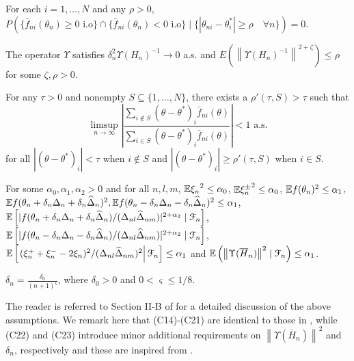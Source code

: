 \begin{pvn}
\item For each $i=1,\ldots,N$ and any $\rho>0$, 
$P(\{ \bar f_{ni} (\theta_n) \ge 0 \text{ i.o}\} \cap \{ \bar f_{ni} (\theta_n) < 0 \text{ i.o}\} \mid \{ |\theta_{ni} - \theta^*_i| \ge \rho\quad \forall n\}) =0.$

\item The operator $\Upsilon$ satisfies $\delta_n^2 \Upsilon(H_n)^{-1} \rightarrow 0$ a.s. and  $E(\left\| \Upsilon(H_n)^{-1}\right\|^{2+\zeta}) \le \rho$ for some $\zeta, \rho>0$.

\item For any $\tau >0$ and nonempty $S \subseteq \{1,\ldots,N\}$, there exists a $\rho'(\tau,S)>\tau$ such that 
$$ \limsup_{n\rightarrow \infty} \left| \dfrac{\sum_{i \notin S} (\theta-\theta^*)_i \bar f_{ni}(\theta)}{\sum_{i \in S} (\theta-\theta^*)_i \bar f_{ni}(\theta)}               \right| < 1 \text{ a.s.}$$
for all $|(\theta-\theta^*)_i| < \tau$ when $i \notin S$ and $|(\theta-\theta^*)_i| \ge \rho'(\tau,S)$ when $i\in S$.
\item For some $\alpha_0, \alpha_1, \alpha_2 >0$ and for all $n,l,m$, $\mathbb{E} {\xi_n}^{2} \le \alpha_0$, $\mathbb{E} {\xi_n^{\pm}}^{2} \le \alpha_0$, $\mathbb{E} f(\theta_n)^{2} \le \alpha_1$,  $\mathbb{E} f(\theta_n + \delta_n \Delta_n + \delta_n \widehat \Delta_n)^{2},\mathbb{E} f(\theta_n - \delta_n \Delta_n - \delta_n \widehat \Delta_n)^{2} \le \alpha_1$, 
$\mathbb{E} \left[| f(\theta_n + \delta_n \Delta_n + \delta_n \widehat \Delta_n)/ (\Delta_{nl}\widehat\Delta_{nm})|^{2+\alpha_2} \mid \mathcal{F}_n\right]$,
$\mathbb{E} \left[ |f(\theta_n - \delta_n \Delta_n - \delta_n \widehat \Delta_n)/ (\Delta_{nl}\widehat\Delta_{nm})|^{2+\alpha_2} \mid \mathcal{F}_n\right]$,
 $\mathbb{E}\left[\left. (\xi_n^+ + \xi_n^- - 2 \xi_n)^2/(\Delta_{nl}\widehat\Delta_{nm})^2 \right| \mathcal{F}_n \right] \le \alpha_1$ 
and $\mathbb{E} \left(\left\| \Upsilon(\overline H_n) \right\|^2 \mid \mathcal{F}_n\right) \le \alpha_1$. 
\item  $\delta_n = \frac{\delta_0}{(n+1)^{\varsigma}}$, where $\delta_0 > 0$ and $0 < \varsigma \le 1/8$.
\end{pvn}
The reader is referred to Section II-B of \cite{prashanth2015rdsa} for a detailed discussion of the above assumptions. We remark here that (C14)-(C21) are identical to those in \cite{prashanth2015rdsa}, while (C22) and (C23) introduce minor additional requirements on $\left\| \Upsilon(\overline H_n) \right\|^2$ and $\delta_n$, respectively and these are inspired from \cite{spall-jacobian}.

